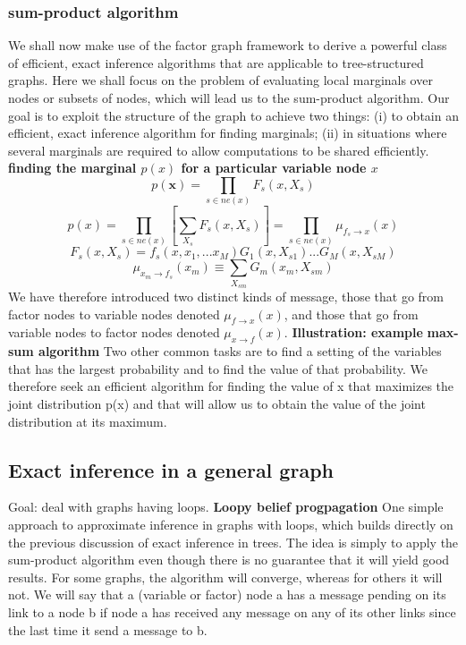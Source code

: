 \documentclass[a4paper]{book}
\renewcommand{\bf}{\mathbf}
\begin{document}
\subsubsection{sum-product algorithm}
We shall now make use of the factor graph framework to derive a powerful class
of efficient, exact inference algorithms that are applicable to tree-structured graphs.
Here we shall focus on the problem of evaluating local marginals over nodes or
subsets of nodes, which will lead us to the sum-product algorithm.\newline
Our goal is to exploit the structure of
the graph to achieve two things: (i) to obtain an efficient, exact inference algorithm
for finding marginals; (ii) in situations where several marginals are required to allow
computations to be shared efficiently.
\textbf{finding the marginal $p(x)$ for a particular variable node $x$}\newline
$$p(\bf x) = \prod_{s\in ne(x)}F_s(x,X_s)   $$
$$p(x) = \prod_{s\in ne(x)}[\sum_{X_s}F_s(x,X_s)] = \prod_{s\in ne(x)}\mu_{f_s\rightarrow x}(x) $$
$$F_s(x,X_s) =  f_s(x,x_1,...x_M)G_1(x,X_{s1})...G_M(x,X_{sM})$$
$$\mu_{x_m\rightarrow f_s}(x_m) \equiv \sum_{X_{sm}}G_m(x_m,X_{sm})$$
We have therefore introduced two distinct kinds of message, those that go from factor
nodes to variable nodes denoted $\mu_{f\rightarrow x}(x)$, and those that go from variable nodes to
factor nodes denoted $\mu_{x\rightarrow f}(x).$
\textbf{Illustration: example}
\textbf{max-sum algorithm}
Two other common tasks are to find a setting of the variables that has the largest probability
and to find the value of that probability. We therefore seek an efficient algorithm for finding the value of x that maximizes
the joint distribution p(x) and that will allow us to obtain the value of the
joint distribution at its maximum.
\subsection{Exact inference in a general graph}
Goal: deal with graphs having loops.\newline
\textbf{Loopy belief progpagation}
One simple approach to approximate inference in graphs with
loops, which builds directly on the previous discussion of exact inference in trees.
The idea is simply to apply the sum-product algorithm even though there is no guarantee
that it will yield good results. For some graphs, the algorithm will converge, whereas for others it will not. \newline
We will say that a (variable or factor) node a has a message pending on its link to a node b if node a has received any
message on any of its other links since the last time it send a message to b.
\end{document}
